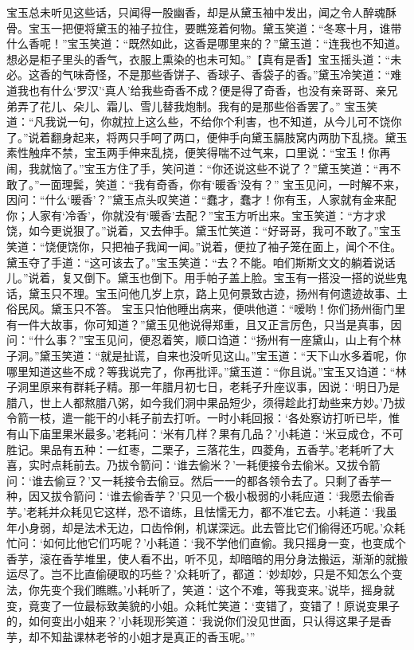 \documentclass[12pt,oneside]{book}
\begin{document}
宝玉总未听见这些话，只闻得一股幽香，却是从黛玉袖中发出，闻之令人醉魂酥骨。宝玉一把便将黛玉的袖子拉住，要瞧笼着何物。黛玉笑道：“冬寒十月，谁带什么香呢！”宝玉笑道：“既然如此，这香是哪里来的？”黛玉道：“连我也不知道。想必是柜子里头的香气，衣服上熏染的也未可知。”【真有是香】宝玉摇头道：“未必。这香的气味奇怪，不是那些香饼子、香球子、香袋子的香。”黛玉冷笑道：“难道我也有什么‘罗汉’‘真人’给我些奇香不成？便是得了奇香，也没有亲哥哥、亲兄弟弄了花儿、朵儿、霜儿、雪儿替我炮制。我有的是那些俗香罢了。”
宝玉笑道：“凡我说一句，你就拉上这么些，不给你个利害，也不知道，从今儿可不饶你了。”说着翻身起来，将两只手呵了两口，便伸手向黛玉膈肢窝内两肋下乱挠。黛玉素性触痒不禁，宝玉两手伸来乱挠，便笑得喘不过气来，口里说：“宝玉！你再闹，我就恼了。”宝玉方住了手，笑问道：“你还说这些不说了？”黛玉笑道：“再不敢了。”一面理鬓，笑道：“我有奇香，你有‘暖香’没有？”
宝玉见问，一时解不来，因问：“什么‘暖香’？”黛玉点头叹笑道：“蠢才，蠢才！你有玉，人家就有金来配你；人家有‘冷香’，你就没有‘暖香’去配？”宝玉方听出来。宝玉笑道：“方才求饶，如今更说狠了。”说着，又去伸手。黛玉忙笑道：“好哥哥，我可不敢了。”宝玉笑道：“饶便饶你，只把袖子我闻一闻。”说着，便拉了袖子笼在面上，闻个不住。黛玉夺了手道：“这可该去了。”宝玉笑道：“去？不能。咱们斯斯文文的躺着说话儿。”说着，复又倒下。黛玉也倒下。用手帕子盖上脸。宝玉有一搭没一搭的说些鬼话，黛玉只不理。宝玉问他几岁上京，路上见何景致古迹，扬州有何遗迹故事、土俗民风。黛玉只不答。
宝玉只怕他睡出病来，便哄他道：“嗳哟！你们扬州衙门里有一件大故事，你可知道？”黛玉见他说得郑重，且又正言厉色，只当是真事，因问：“什么事？”宝玉见问，便忍着笑，顺口诌道：“扬州有一座黛山，山上有个林子洞。”黛玉笑道：“就是扯谎，自来也没听见这山。”宝玉道：“天下山水多着呢，你哪里知道这些不成？等我说完了，你再批评。”黛玉道：“你且说。”宝玉又诌道：“林子洞里原来有群耗子精。那一年腊月初七日，老耗子升座议事，因说：‘明日乃是腊八，世上人都熬腊八粥，如今我们洞中果品短少，须得趁此打劫些来方妙。’乃拔令箭一枝，遣一能干的小耗子前去打听。一时小耗回报：‘各处察访打听已毕，惟有山下庙里果米最多。’老耗问：‘米有几样？果有几品？’小耗道：‘米豆成仓，不可胜记。果品有五种：一红枣，二栗子，三落花生，四菱角，五香芋。’老耗听了大喜，实时点耗前去。乃拔令箭问：‘谁去偷米？’一耗便接令去偷米。又拔令箭问：‘谁去偷豆？’又一耗接令去偷豆。然后一一的都各领令去了。只剩了香芋一种，因又拔令箭问：‘谁去偷香芋？’只见一个极小极弱的小耗应道：‘我愿去偷香芋。’老耗并众耗见它这样，恐不谙练，且怯懦无力，都不准它去。小耗道：‘我虽年小身弱，却是法术无边，口齿伶俐，机谋深远。此去管比它们偷得还巧呢。’众耗忙问：‘如何比他它们巧呢？’小耗道：‘我不学他们直偷。我只摇身一变，也变成个香芋，滚在香芋堆里，使人看不出，听不见，却暗暗的用分身法搬运，渐渐的就搬运尽了。岂不比直偷硬取的巧些？’众耗听了，都道：‘妙却妙，只是不知怎么个变法，你先变个我们瞧瞧。’小耗听了，笑道：‘这个不难，等我变来。’说毕，摇身就变，竟变了一位最标致美貌的小姐。众耗忙笑道：‘变错了，变错了！原说变果子的，如何变出小姐来？’小耗现形笑道：‘我说你们没见世面，只认得这果子是香芋，却不知盐课林老爷的小姐才是真正的香玉呢。’”
\end{document}
